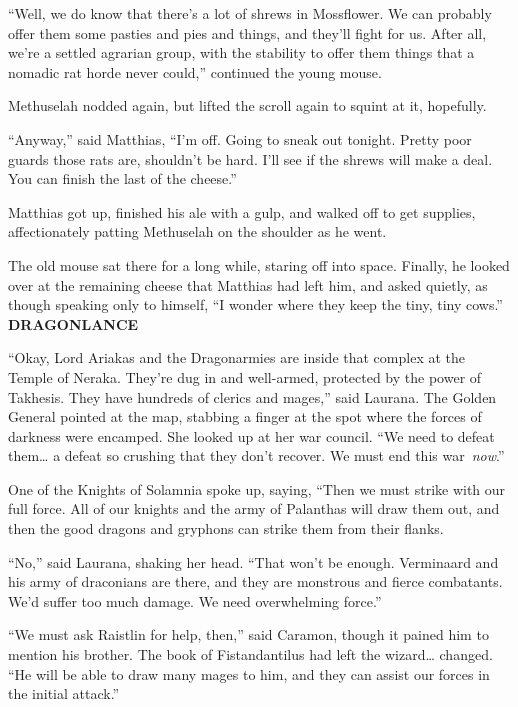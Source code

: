 ``Well, we do know that there's a lot of shrews in Mossflower. We can
probably offer them some pasties and pies and things, and they'll fight
for us. After all, we're a settled agrarian group, with the stability to
offer them things that a nomadic rat horde never could,'' continued the
young mouse.

Methuselah nodded again, but lifted the scroll again to squint at it,
hopefully.

``Anyway,'' said Matthias, ``I'm off. Going to sneak out tonight. Pretty
poor guards those rats are, shouldn't be hard. I'll see if the shrews
will make a deal. You can finish the last of the cheese.''

Matthias got up, finished his ale with a gulp, and walked off to get
supplies, affectionately patting Methuselah on the shoulder as he went.

The old mouse sat there for a long while, staring off into space.
Finally, he looked over at the remaining cheese that Matthias had left
him, and asked quietly, as though speaking only to himself, ``I wonder
where they keep the tiny, tiny cows.''\\

\textbf{DRAGONLANCE}

``Okay, Lord Ariakas and the Dragonarmies are inside that complex at the
Temple of Neraka. They're dug in and well-armed, protected by the power
of Takhesis. They have hundreds of clerics and mages,'' said Laurana.
The Golden General pointed at the map, stabbing a finger at the spot
where the forces of darkness were encamped. She looked up at her war
council. ``We need to defeat them\ldots{} a defeat so crushing that they
don't recover. We must end this war~\emph{now}.''

One of the Knights of Solamnia spoke up, saying, ``Then we must strike
with our full force. All of our knights and the army of Palanthas will
draw them out, and then the good dragons and gryphons can strike them
from their flanks.

``No,'' said Laurana, shaking her head. ``That won't be enough.
Verminaard and his army of draconians are there, and they are monstrous
and fierce combatants. We'd suffer too much damage. We need overwhelming
force.''

``We must ask Raistlin for help, then,'' said Caramon, though it pained
him to mention his brother. The book of Fistandantilus had left the
wizard\ldots{} changed. ``He will be able to draw many mages to him, and
they can assist our forces in the initial attack.''

